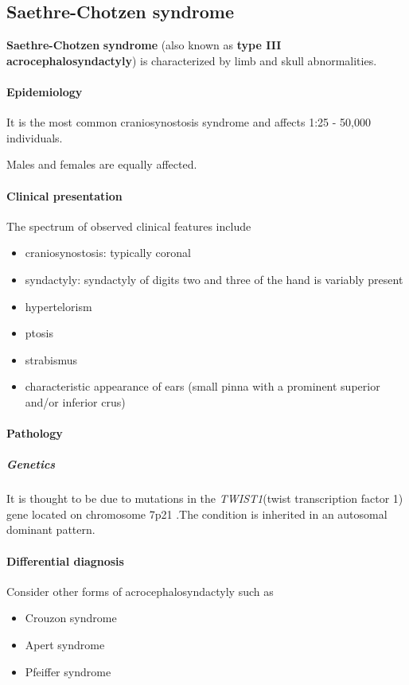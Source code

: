 \subsection{Saethre-Chotzen syndrome}

\textbf{Saethre-Chotzen} \textbf{syndrome} (also known as \textbf{type III acrocephalosyndactyly}) is characterized by limb and skull abnormalities.

\paragraph{Epidemiology}

It is the most common craniosynostosis syndrome and affects 1:25 - 50,000 individuals.

Males and females are equally affected.

\paragraph{Clinical presentation}

The spectrum of observed clinical features include

\begin{itemize}
	\tightlist
	\item
	craniosynostosis: typically coronal
	\item
	syndactyly: syndactyly of digits two and three of the hand is variably present
	\item
	hypertelorism
	\item
	ptosis
	\item
	strabismus
	\item
	characteristic appearance of ears (small pinna with a prominent superior and/or inferior crus)
\end{itemize}

\paragraph{Pathology}

\subparagraph{Genetics}

It is thought to be due to mutations in the \emph{TWIST1}(twist transcription factor 1) gene located on chromosome 7p21 .The condition is inherited in an autosomal dominant pattern.

\paragraph{Differential diagnosis}

Consider other forms of acrocephalosyndactyly such as

\begin{itemize}
	\tightlist
	\item
	Crouzon syndrome
	\item
	Apert syndrome
	\item
	Pfeiffer syndrome
\end{itemize}